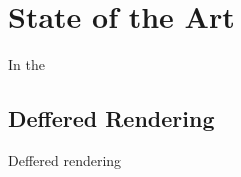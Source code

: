 \chapter{State of the Art}
\label{chapter:Chapter 2}


In the  

\section{Deffered Rendering}

Deffered rendering 